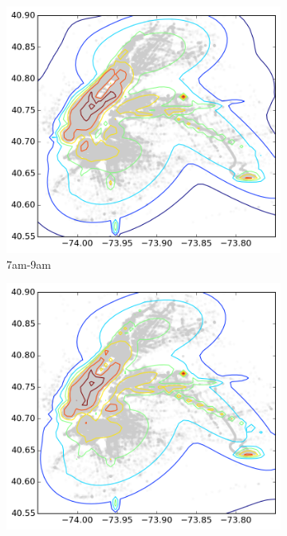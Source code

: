 \documentclass[12pt]{article}
\theoremstyle{definition}
\theoremstyle{algodesc}
\begin{document}
\begin{figure}[htbp] \centering
  \begin{subfigure}[t]{.49\linewidth}
    \includegraphics[width=\linewidth]{./include/gmm_cat_morn.png}
    \caption{7am-9am} \label{fig:dist:morning}
  \end{subfigure}
  \begin{subfigure}[t]{.49\linewidth}
    \includegraphics[width=\linewidth]{./include/gmm_cat_night.png}

\end{subfigure}
\end{figure}
\end{document}
